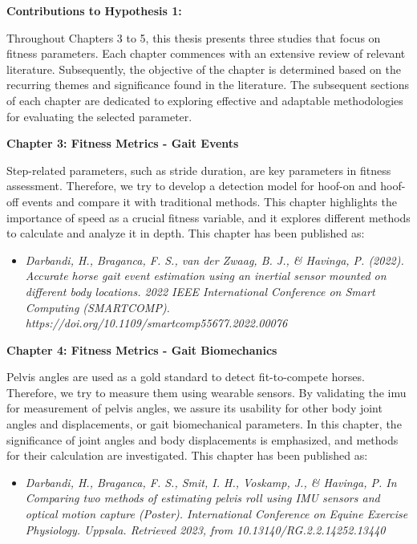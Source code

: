 \noindent \textbf{\large Contributions to Hypothesis 1:} 

\vspace{0.1cm}

Throughout Chapters 3 to 5, this thesis presents three studies that focus on fitness parameters. Each chapter commences with an extensive review of relevant literature. Subsequently, the objective of the chapter is determined based on the recurring themes and significance found in the literature. The subsequent sections of each chapter are dedicated to exploring effective and adaptable methodologies for evaluating the selected parameter. 

\vspace{0.25cm}

\noindent\textbf{Chapter 3: Fitness Metrics - Gait Events}

\noindent Step-related parameters, such as stride duration, are key parameters in fitness assessment. Therefore, we try to develop a detection model for hoof-on and hoof-off events and compare it with traditional methods. This chapter highlights the importance of speed as a crucial fitness variable, and it explores different methods to calculate and analyze it in depth. This chapter has been published as:

\begin{itemize}
\item[]\begin{footnotesize}\textit{Darbandi, H., Braganca, F. S., van der Zwaag, B. J., \& Havinga, P. (2022). Accurate horse gait event estimation using an inertial sensor mounted on different body locations. 2022 IEEE International Conference on Smart Computing (SMARTCOMP). https://doi.org/10.1109/smartcomp55677.2022.00076} \end{footnotesize}
\end{itemize}

\noindent\textbf{Chapter 4: Fitness Metrics - Gait Biomechanics}

\noindent Pelvis angles are used as a gold standard to detect fit-to-compete horses. Therefore, we try to measure them using wearable sensors. By validating the \gls{imu} for measurement of pelvis angles, we assure its usability for other body joint angles and displacements, or gait biomechanical parameters. In this chapter, the significance of joint angles and body displacements is emphasized, and methods for their calculation are investigated. This chapter has been published as:
\begin{itemize}
    \item[]\begin{footnotesize}\textit{Darbandi, H., Braganca, F. S., Smit, I. H., Voskamp, J., \& Havinga, P. In Comparing two methods of estimating pelvis roll using IMU sensors and optical motion capture (Poster). International Conference on Equine Exercise Physiology.  Uppsala. Retrieved 2023, from 10.13140/RG.2.2.14252.13440}\end{footnotesize}\end{itemize}


